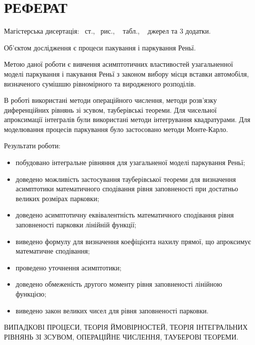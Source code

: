 \chapter*{РЕФЕРАТ}

Магістерська дисертація: \pageref*{MyLastPage}~ст., \totfig~рис., \tottab~ табл., ~ джерел та 3 додатки.

Об'єктом дослідження є процеси пакування і паркування Реньї.

Метою даної роботи є вивчення асимптотичних властивостей узагальненної моделі паркування і пакування Реньї з законом вибору місця вставки автомобіля, визначеного сумішшю рівномірного та виродженого розподілів.

В роботі використані методи операційного числення, методи розв'язку диференційних рівнянь зі зсувом, тауберівські теореми. Для чисельної апроксимації інтегралів були використані методи інтегрування квадратурами. Для моделювання процесів паркування було застосовано методи Монте-Карло.

Результати роботи:
\begin{itemize}
	\item побудовано інтегральне рівняння для узагальненої моделі паркування Реньї;
	\item доведено можливість застосування тауберівської теореми для визначення асимптотики математичного сподівання рівня заповненості при достатньо великих розмірах парковки;
	\item доведено асимптотичну еквівалентність математичного сподівання рівня заповненості парковки лінійній функції;
	\item виведено формулу для визначення коефіцієнта нахилу прямої, що апроксимує математичне сподівання;
	\item проведено уточнення асимптотики;
	\item доведено обмеженість другого моменту рівня заповненості лінійною функцією;
	\item виведено закон великих чисел для рівня заповненості парковки.
\end{itemize}

\MakeUppercase{випадкові процеси, теорія ймовірностей, теорія інтегральних рівнянь зі зсувом, операційне числення, тауберові теореми.} 